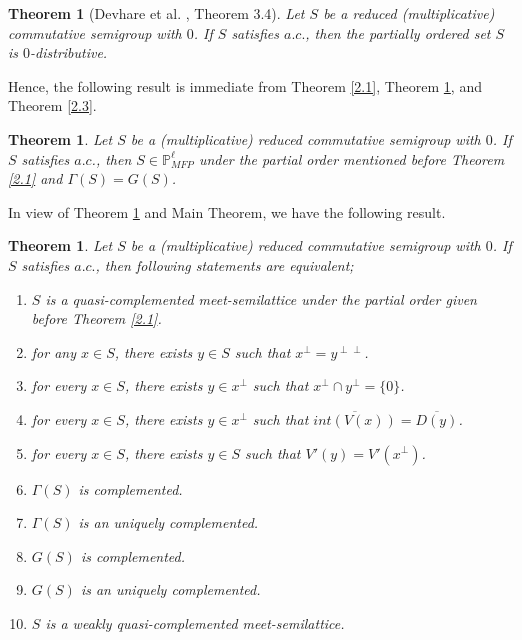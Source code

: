 \documentclass[10pt,one side,emlines]{amsart}
\newtheorem{theorem}[lem]{Theorem}
\theoremstyle{definition}
\begin{document}
\begin{theorem}[Devhare et al. \cite{DJL}, Theorem 3.4]\label{2.2} Let $S$ be a reduced (multiplicative)  commutative semigroup with $0$. If $S$ satisfies $a.c.$, then the partially ordered set $S$ is $0$-distributive.
\end{theorem}

Hence, the following result is immediate from Theorem \ref{2.1},  Theorem \ref{2.2}, and Theorem \ref{2.3}.

\begin{theorem}\label{2.4} Let $S$ be a (multiplicative) reduced commutative semigroup with $0$. If $S$ satisfies $a.c$., then $S\in \mathbb{P}^{\ell}_{MFP}$ under the partial order mentioned before Theorem \ref{2.1} and $\Gamma (S) = G(S)$. 
\end{theorem}

In view of Theorem \ref{2.4} and Main Theorem, we have the following result.

\begin{theorem} Let $S$ be a (multiplicative) reduced commutative semigroup with $0$. If $S$ satisfies $a.c.$, then following statements are equivalent;
	\begin{enumerate}
		\item[(1)] $S$ is a quasi-complemented meet-semilattice under the partial order given before Theorem \ref{2.1}.
		\item[(2)] 	for any $x \in S$, there exists $y \in S$ such that $x^{\perp}= y^{\perp \perp}$.
		\item[(3)] for every $x\in S$, there exists $y\in x^{\perp}$ such that $x^{\perp}\cap y^{\perp}=\{0\}$.
		\item[(4)] for every $x\in S$, there exists $y\in x^{\perp}$ such that $\overline{int(V(x))}=\overline{D(y)}$.
		\item[(5)] for every $x\in S$, there exists $y\in S$ such that $V'(y)=V'(x^{\perp})$.
		\item[(6)] $\Gamma(S)$ is complemented.
		\item[(7)] $\Gamma(S)$ is an uniquely complemented.
		\item[(8)] $G(S)$ is complemented.
		\item[(9)] $G(S)$ is an uniquely complemented.
		\item[(10)] $S$ is a weakly quasi-complemented meet-semilattice.
	\end{enumerate}	
	
\end{theorem}
\end{document}
